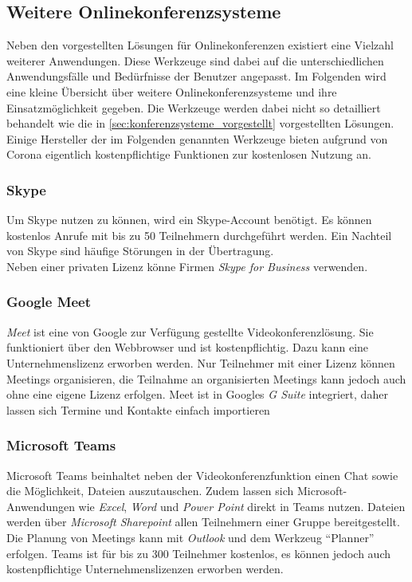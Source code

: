 \subsection{Weitere Onlinekonferenzsysteme}
Neben den vorgestellten Lösungen für Onlinekonferenzen existiert eine Vielzahl weiterer Anwendungen.
Diese Werkzeuge sind dabei auf die unterschiedlichen Anwendungsfälle und Bedürfnisse der Benutzer angepasst.
Im Folgenden wird eine kleine Übersicht über weitere Onlinekonferenzsysteme und ihre Einsatzmöglichkeit gegeben.
Die Werkzeuge werden dabei nicht so detailliert behandelt wie die in \autoref{sec:konferenzsysteme_vorgestellt} vorgestellten Lösungen.
\\
Einige Hersteller der im Folgenden genannten Werkzeuge bieten aufgrund von Corona eigentlich kostenpflichtige Funktionen zur kostenlosen Nutzung an.
\autocite[Vgl.][]{M_Straub.o.J.}

\subsubsection{Skype}
Um Skype nutzen zu können, wird ein Skype-Account benötigt.
Es können kostenlos Anrufe mit bis zu 50 Teilnehmern durchgeführt werden.
Ein Nachteil von Skype sind häufige Störungen in der Übertragung.
\autocite[Vgl.][]{M_Straub.o.J.}
\\
Neben einer privaten Lizenz könne Firmen \textit{Skype for Business} verwenden.
\autocite[Vgl.][]{M_Microsoft.o.J.}

\subsubsection{Google Meet}
\textit{Meet} ist eine von Google zur Verfügung gestellte Videokonferenzlösung.
Sie funktioniert über den Webbrowser und ist kostenpflichtig.
Dazu kann eine Unternehmenslizenz erworben werden.
Nur Teilnehmer mit einer Lizenz können Meetings organisieren, die Teilnahme an organisierten Meetings kann jedoch auch ohne eine eigene Lizenz erfolgen.
Meet ist in Googles \textit{G Suite} integriert, daher lassen sich Termine und Kontakte einfach importieren
\autocite[Vgl.][]{M_Straub.o.J.}

\subsubsection{Microsoft Teams}
Microsoft Teams beinhaltet neben der Videokonferenzfunktion einen Chat sowie die Möglichkeit, Dateien auszutauschen.
Zudem lassen sich Microsoft-Anwendungen wie \textit{Excel}, \textit{Word} und \textit{Power Point} direkt in Teams nutzen.
Dateien werden über \textit{Microsoft Sharepoint} allen Teilnehmern einer Gruppe bereitgestellt.
Die Planung von Meetings kann mit \textit{Outlook} und dem Werkzeug \enquote{Planner} erfolgen.
Teams ist für bis zu 300 Teilnehmer kostenlos, es können jedoch auch kostenpflichtige Unternehmenslizenzen erworben werden.
\autocite[Vgl.][]{M_Straub.o.J.}

